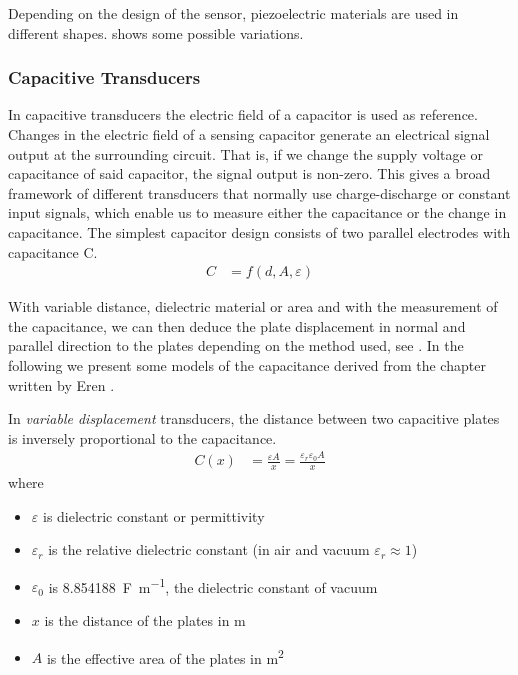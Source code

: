 Depending on the design of the sensor, piezoelectric materials are used in different shapes.  shows some possible variations.


\subsubsection{Capacitive Transducers}

In capacitive transducers the electric field of a capacitor is used as reference. Changes in the electric field of a sensing capacitor generate an electrical signal output at the surrounding circuit. That is, if we change the supply voltage or capacitance of said capacitor, the signal output is non-zero. This gives a broad framework of different transducers that normally use charge-discharge or constant input signals, which enable us to measure either the capacitance or the change in capacitance. The simplest capacitor design consists of two parallel electrodes with capacitance C.
\begin{align}
  C &= f(d,A,\varepsilon)
\end{align}

With variable distance, dielectric material or area and with the measurement of the capacitance, we can then deduce the plate displacement in normal and parallel direction to the plates depending on the method used, see . In the following we present some models of the capacitance derived from the chapter written by Eren \cite{webster2018measurement}.

In \emph{variable displacement} transducers, the distance between two capacitive plates is inversely proportional to the capacitance.
\begin{align}
  C(x) &= \frac{\varepsilon A}{x} = \frac{\varepsilon_r\varepsilon_0 A}{x}
\end{align}
where
\begin{itemize}
  \item $\varepsilon$ is dielectric constant or permittivity
  \item $\varepsilon_r$ is the relative dielectric constant (in air and vacuum $\varepsilon_r\approx 1$)
  \item $\varepsilon_0$ is \SI{8.854188}{\farad\per\meter}, the dielectric constant of vacuum
  \item $x$ is the distance of the plates in \si{\meter}
  \item $A$ is the effective area of the plates in \si{\meter\squared}
\end{itemize}

